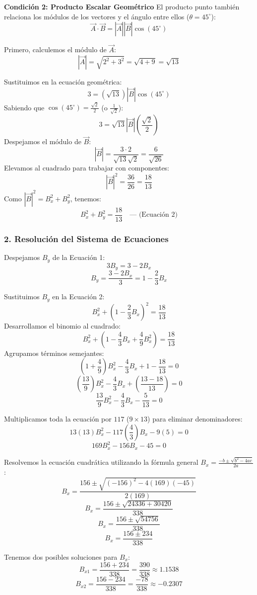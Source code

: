 \documentclass[12pt, a4paper]{article}
\begin{document}
\textbf{Condición 2: Producto Escalar Geométrico}
El producto punto también relaciona los módulos de los vectores y el ángulo entre ellos ($\theta = 45^\circ$):
$$ \vec{A} \cdot \vec{B} = |\vec{A}| |\vec{B}| \cos(45^\circ) $$

Primero, calculemos el módulo de $\vec{A}$:
$$ |\vec{A}| = \sqrt{2^2 + 3^2} = \sqrt{4 + 9} = \sqrt{13} $$

Sustituimos en la ecuación geométrica:
$$ 3 = (\sqrt{13}) |\vec{B}| \cos(45^\circ) $$
Sabiendo que $\cos(45^\circ) = \frac{\sqrt{2}}{2}$ (o $\frac{1}{\sqrt{2}}$):
$$ 3 = \sqrt{13} |\vec{B}| \left(\frac{\sqrt{2}}{2}\right) $$
Despejamos el módulo de $\vec{B}$:
$$ |\vec{B}| = \frac{3 \cdot 2}{\sqrt{13} \sqrt{2}} = \frac{6}{\sqrt{26}} $$
Elevamos al cuadrado para trabajar con componentes:
$$ |\vec{B}|^2 = \frac{36}{26} = \frac{18}{13} $$
Como $|\vec{B}|^2 = B_x^2 + B_y^2$, tenemos:
$$ B_x^2 + B_y^2 = \frac{18}{13} \quad \text{--- (Ecuación 2)} $$

\subsubsection*{2. Resolución del Sistema de Ecuaciones}
Despejamos $B_y$ de la Ecuación 1:
$$ 3B_y = 3 - 2B_x $$
$$ B_y = \frac{3 - 2B_x}{3} = 1 - \frac{2}{3}B_x $$

Sustituimos $B_y$ en la Ecuación 2:
$$ B_x^2 + \left(1 - \frac{2}{3}B_x\right)^2 = \frac{18}{13} $$
Desarrollamos el binomio al cuadrado:
$$ B_x^2 + \left(1 - \frac{4}{3}B_x + \frac{4}{9}B_x^2\right) = \frac{18}{13} $$
Agrupamos términos semejantes:
$$ \left(1 + \frac{4}{9}\right)B_x^2 - \frac{4}{3}B_x + 1 - \frac{18}{13} = 0 $$
$$ \left(\frac{13}{9}\right)B_x^2 - \frac{4}{3}B_x + \left(\frac{13 - 18}{13}\right) = 0 $$
$$ \frac{13}{9}B_x^2 - \frac{4}{3}B_x - \frac{5}{13} = 0 $$

Multiplicamos toda la ecuación por $117$ ($9 \times 13$) para eliminar denominadores:
$$ 13(13)B_x^2 - 117\left(\frac{4}{3}\right)B_x - 9(5) = 0 $$
$$ 169B_x^2 - 156B_x - 45 = 0 $$

Resolvemos la ecuación cuadrática utilizando la fórmula general $B_x = \frac{-b \pm \sqrt{b^2 - 4ac}}{2a}$:
$$ B_x = \frac{156 \pm \sqrt{(-156)^2 - 4(169)(-45)}}{2(169)} $$
$$ B_x = \frac{156 \pm \sqrt{24336 + 30420}}{338} $$
$$ B_x = \frac{156 \pm \sqrt{54756}}{338} $$
$$ B_x = \frac{156 \pm 234}{338} $$

Tenemos dos posibles soluciones para $B_x$:
$$ B_{x1} = \frac{156 + 234}{338} = \frac{390}{338} \approx 1.1538 $$
$$ B_{x2} = \frac{156 - 234}{338} = \frac{-78}{338} \approx -0.2307 $$
\end{document}
